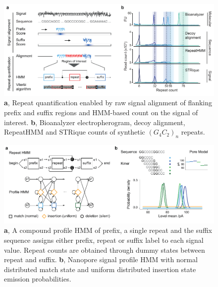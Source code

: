 \begin{figure}[h]
    \centering
    \includegraphics[width=1.0\textwidth]{figures/strique/count_structure_plasmid.pdf}
    \captionsetup{format=plain}
    \caption[STRique: generic repeat detection pipeline on raw nanopore signals.]{\textbf{a}, Repeat quantification enabled by raw signal alignment of flanking prefix and suffix regions and HMM-based count on the signal of interest. \textbf{b}, Bioanalyzer electropherogram, decoy alignment, RepeatHMM and STRique counts of synthetic $ (G_{4}C_{2})_{n} $ repeats.}
    \label{fig:strique:count_structure_plasmid}
\end{figure}

\begin{figure}[h]
    \centering
    \includegraphics[width=1.0\textwidth]{figures/strique/count_hmm.pdf}
    \captionsetup{format=plain}
    \caption[Nanopore signal processing with STRique]{\textbf{a}, A compound profile HMM of prefix, a single repeat and the suffix sequence assigns either prefix, repeat or suffix label to each signal value. Repeat counts are obtained through dummy states between repeat and suffix. \textbf{b}, Nanopore signal profile HMM with normal distributed match state and uniform distributed insertion state emission probabilities.}
    \label{fig:strique:count_hmm}
\end{figure}

